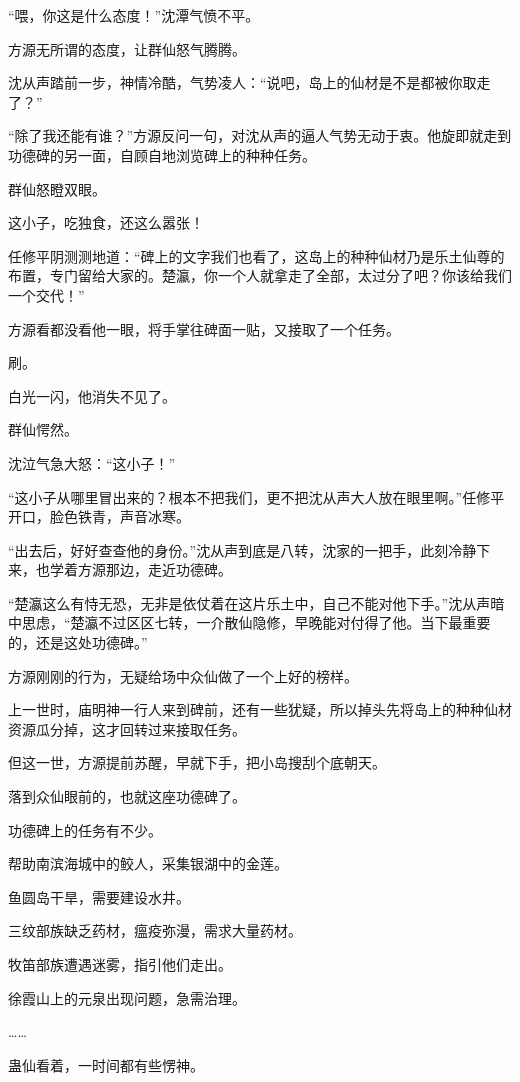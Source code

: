 \begin{this_body}
“喂，你这是什么态度！”沈潭气愤不平。

方源无所谓的态度，让群仙怒气腾腾。

沈从声踏前一步，神情冷酷，气势凌人：“说吧，岛上的仙材是不是都被你取走了？”

“除了我还能有谁？”方源反问一句，对沈从声的逼人气势无动于衷。他旋即就走到功德碑的另一面，自顾自地浏览碑上的种种任务。

群仙怒瞪双眼。

这小子，吃独食，还这么嚣张！

任修平阴测测地道：“碑上的文字我们也看了，这岛上的种种仙材乃是乐土仙尊的布置，专门留给大家的。楚瀛，你一个人就拿走了全部，太过分了吧？你该给我们一个交代！”

方源看都没看他一眼，将手掌往碑面一贴，又接取了一个任务。

刷。

白光一闪，他消失不见了。

群仙愕然。

沈泣气急大怒：“这小子！”

“这小子从哪里冒出来的？根本不把我们，更不把沈从声大人放在眼里啊。”任修平开口，脸色铁青，声音冰寒。

“出去后，好好查查他的身份。”沈从声到底是八转，沈家的一把手，此刻冷静下来，也学着方源那边，走近功德碑。

“楚瀛这么有恃无恐，无非是依仗着在这片乐土中，自己不能对他下手。”沈从声暗中思虑，“楚瀛不过区区七转，一介散仙隐修，早晚能对付得了他。当下最重要的，还是这处功德碑。”

方源刚刚的行为，无疑给场中众仙做了一个上好的榜样。

上一世时，庙明神一行人来到碑前，还有一些犹疑，所以掉头先将岛上的种种仙材资源瓜分掉，这才回转过来接取任务。

但这一世，方源提前苏醒，早就下手，把小岛搜刮个底朝天。

落到众仙眼前的，也就这座功德碑了。

功德碑上的任务有不少。

帮助南滨海城中的鲛人，采集银湖中的金莲。

鱼圆岛干旱，需要建设水井。

三纹部族缺乏药材，瘟疫弥漫，需求大量药材。

牧笛部族遭遇迷雾，指引他们走出。

徐霞山上的元泉出现问题，急需治理。

……

蛊仙看着，一时间都有些愣神。


\end{this_body}
